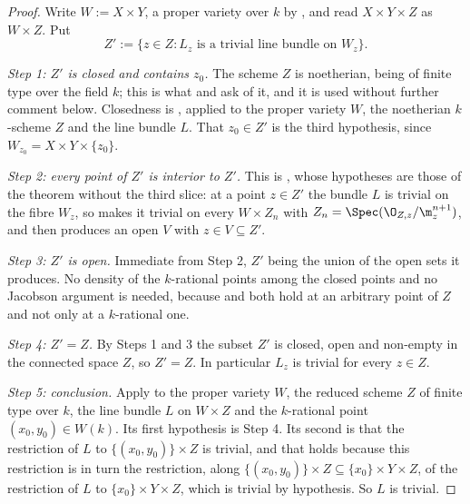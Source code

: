 \begin{proof}
Write $W:=X\times Y$, a proper variety over $k$ by
, and read $X\times Y\times Z$ as $W\times Z$.
Put
\[
  Z':=\{z\in Z:L_z\text{ is a trivial line bundle on }W_z\} .
\]

\emph{Step 1: $Z'$ is closed and contains $z_0$.}  The scheme $Z$ is
noetherian, being of finite type over the field $k$; this is what
 and  ask
of it, and it is used without further comment below.  Closedness is
, applied to the proper variety $W$, the
noetherian $k$-scheme $Z$ and the line bundle $L$.  That $z_0\in Z'$ is the
third hypothesis, since $W_{z_0}=X\times Y\times\{z_0\}$.

\emph{Step 2: every point of $Z'$ is interior to $Z'$.}  This is
, whose hypotheses are those of the theorem
without the third slice: at a point $z\in Z'$ the bundle $L$ is trivial on the
fibre $W_z$, so  makes it trivial on
every $W\times Z_n$ with $Z_n=\Spec(\O_{Z,z}/\m_z^{n+1})$, and
 then produces an open $V$ with
$z\in V\subseteq Z'$.

\emph{Step 3: $Z'$ is open.}  Immediate from Step 2, $Z'$ being the union of
the open sets it produces.  No density of the $k$-rational points among the
closed points and no Jacobson argument is needed, because
 and
 both hold at an arbitrary point of $Z$ and
not only at a $k$-rational one.

\emph{Step 4: $Z'=Z$.}  By Steps 1 and 3 the subset $Z'$ is closed, open and
non-empty in the connected space $Z$, so $Z'=Z$.  In particular $L_z$ is
trivial for every $z\in Z$.

\emph{Step 5: conclusion.}  Apply  to the proper
variety $W$, the reduced scheme $Z$ of finite type over $k$, the line bundle
$L$ on $W\times Z$ and the $k$-rational point $(x_0,y_0)\in W(k)$.  Its first
hypothesis is Step 4.  Its second is that the restriction of $L$ to
$\{(x_0,y_0)\}\times Z$ is trivial, and that holds because this restriction is
in turn the restriction, along $\{(x_0,y_0)\}\times Z\subseteq
\{x_0\}\times Y\times Z$, of the restriction of $L$ to
$\{x_0\}\times Y\times Z$, which is trivial by hypothesis.  So $L$ is trivial.
\end{proof}

